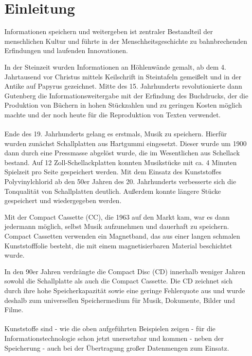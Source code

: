 \section{Einleitung}


Informationen speichern und weitergeben ist zentraler Bestandteil der menschlichen Kultur und führte 
in der Menschheitsgeschichte zu bahnbrechenden Erfindungen und laufenden Innovationen.

In der Steinzeit wurden Informationen an Höhlenwände gemalt, ab dem 4. Jahrtausend vor Christus
mittels  Keilschrift in Steintafeln gemeißelt und in der Antike auf Papyrus gezeichnet. Mitte
des 15. Jahrhunderts revolutionierte dann Gutenberg die Informationsweitergabe mit der Erfindung des
Buchdrucks, der die Produktion von Büchern in hohen Stückzahlen und zu geringen Kosten möglich
machte und der noch heute für die Reproduktion von Texten verwendet.

\paragraph{}
Ende des 19. Jahrhunderts gelang es erstmals, Musik zu speichern. Hierfür wurden zunächst
Schallplatten aus Hartgummi eingesetzt. Dieser wurde um 1900 dann durch eine Pressmasse abgelöst
wurde, die im Wesentlichen aus Schellack bestand. Auf 12 Zoll-Schellackplatten konnten Musikstücke
mit ca. 4 Minuten Spielzeit pro Seite gespeichert werden. Mit dem Einsatz des Kunststoffes
Polyvinylchlorid ab den 50er Jahren des 20. Jahrhunderts verbesserte sich die Tonqualität von
Schallplatten deutlich. Außerdem konnte längere Stücke gespeichert und wiedergegeben werden. 

Mit der Compact Cassette (CC), die 1963 auf den Markt kam, war es dann jedermann möglich, selbst
Musik aufzunehmen und dauerhaft zu speichern. Compact Cassetten verwenden ein Magnetband, das aus
einer langen schmalen Kunststofffolie besteht, die mit einem magnetisierbaren Material beschichtet wurde. 

In den 90er Jahren verdrängte  die Compact Disc (CD) innerhalb weniger Jahren sowohl die
Schallplatte als auch die Compact Cassette. Die CD zeichnet sich durch ihre hohe Speicherkapazität
sowie eine geringe Fehlerquote aus und wurde deshalb zum universellen Speichermedium für Musik, Dokumente,
Bilder und Filme.

\paragraph{}
Kunststoffe sind - wie die oben aufgeführten Beispielen zeigen - für die Informationstechnologie
schon jetzt unersetzbar und kommen - neben der Speicherung - auch bei der Übertragung großer
Datenmengen zum Einsatz.

